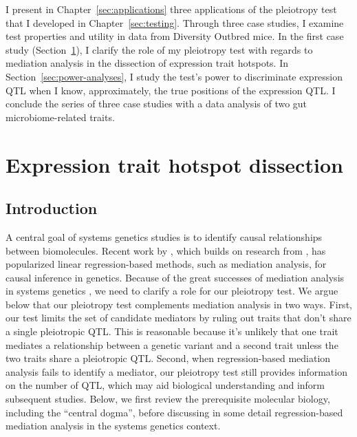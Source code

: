 \documentclass[oneside]{book}\usepackage[]{graphicx}\usepackage[]{color}
\begin{document}
I present in Chapter~\ref{sec:applications} three applications of the
pleiotropy test that I developed in Chapter~\ref{sec:testing}. Through three case studies, I examine test properties and utility in data from Diversity Outbred mice. In the first case study (Section~\ref{sec:hotspot-dissection}), I clarify the role of my pleiotropy test with regards to mediation analysis in the dissection of expression trait hotspots. In Section~\ref{sec:power-analyses}, I study the test's power to discriminate expression QTL when I know, approximately, the true positions of the expression QTL. I conclude the series of three case studies with a data analysis of two gut microbiome-related traits.


\section{Expression trait hotspot dissection}\label{sec:hotspot-dissection}
\subsection{Introduction}

A central goal of systems genetics studies is to identify causal relationships between biomolecules. 
Recent work by \citet{chick2016defining}, which builds on research from \citet{baron1986moderator}, has popularized linear regression-based methods, such as mediation analysis, for causal inference in genetics. 
Because of the great successes of mediation analysis in systems genetics 
\citep{chick2016defining,keller2018genetic}, we need to clarify a role for our pleiotropy test. 
We argue below that our pleiotropy test complements mediation analysis in two ways. 
First, our test limits the set of candidate mediators by ruling out traits that don't share 
a single pleiotropic QTL. 
This is reasonable because it's unlikely that one trait mediates a relationship between a 
genetic variant and a second trait unless the two traits share a pleiotropic QTL. 
Second, when regression-based mediation analysis fails to identify a mediator, our 
pleiotropy test still provides information on the number of QTL, which may aid biological 
understanding and inform subsequent studies. Below, we first review the prerequisite 
molecular biology, including the ``central dogma'', before discussing in some detail 
regression-based mediation analysis in the systems genetics context. 
\end{document}
